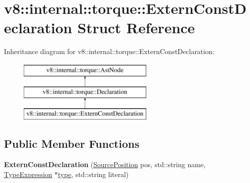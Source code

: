 \hypertarget{structv8_1_1internal_1_1torque_1_1ExternConstDeclaration}{}\section{v8\+:\+:internal\+:\+:torque\+:\+:Extern\+Const\+Declaration Struct Reference}
\label{structv8_1_1internal_1_1torque_1_1ExternConstDeclaration}
Inheritance diagram for v8\+:\+:internal\+:\+:torque\+:\+:Extern\+Const\+Declaration\+:\begin{figure}[H]
\begin{center}
\leavevmode
\includegraphics[height=3.000000cm]{structv8_1_1internal_1_1torque_1_1ExternConstDeclaration}
\end{center}
\end{figure}
\subsection*{Public Member Functions}
\begin{DoxyCompactItemize}
\item 
\mbox{\label{structv8_1_1internal_1_1torque_1_1ExternConstDeclaration_a340f2d24a1b341e80db3f9061db2db9d}} 
{\bfseries Extern\+Const\+Declaration} (\mbox{\hyperlink{structv8_1_1internal_1_1torque_1_1SourcePosition}{Source\+Position}} pos, std\+::string name, \mbox{\hyperlink{structv8_1_1internal_1_1torque_1_1TypeExpression}{Type\+Expression}} $\ast$\mbox{\hyperlink{classstd_1_1conditional_1_1type}{type}}, std\+::string literal)
\end{DoxyCompactItemize}
